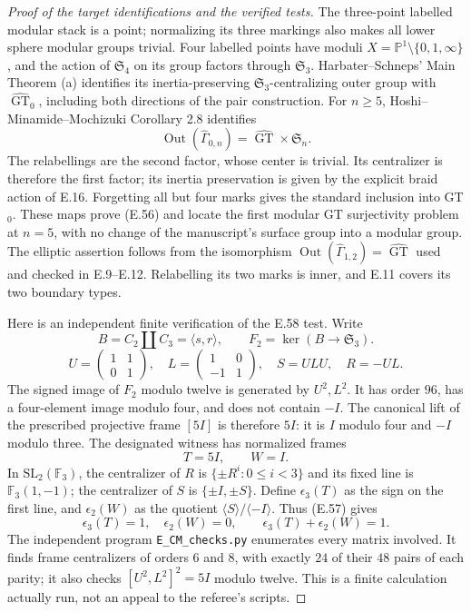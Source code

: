 \begin{proof}[Proof of the target identifications and the verified tests]
The three-point labelled modular stack is a point;
normalizing its three markings also makes all lower
sphere modular groups trivial.  Four labelled points
have moduli $X=\mathbb P^1\setminus\{0,1,\infty\}$,
and the action of $\mathfrak S_4$ on its group factors
through $\mathfrak S_3$.  Harbater--Schneps' Main
Theorem (a) identifies its inertia-preserving
$\mathfrak S_3$-centralizing outer group with
$\widehat{\operatorname{GT}}_0$, including both
directions of the pair construction.  For $n\geq5$,
Hoshi--Minamide--Mochizuki Corollary 2.8 identifies
\[
 \operatorname{Out}(\widehat\Gamma_{0,n})
       =\widehat{\operatorname{GT}}\times\mathfrak S_n.
\]
The relabellings are the second factor, whose center
is trivial.  Its centralizer is therefore the first
factor; its inertia preservation is given by the
explicit braid action of E.16.  Forgetting all but
four marks gives the standard inclusion into GT$_0$.
These maps prove (E.56) and locate the first modular
GT surjectivity problem at $n=5$, with no change of
the manuscript's surface group into a modular group.
The elliptic assertion follows from the isomorphism
$\operatorname{Out}(\widehat\Gamma_{1,2})=\widehat{\operatorname{GT}}$
used and checked in E.9--E.12.  Relabelling its two
marks is inner, and E.11 covers its two boundary types.

Here is an independent finite verification of the
E.58 test.  Write
\[
 B=C_2\amalg C_3=\langle s,r\rangle,\qquad
 F_2=\ker(B\to\mathfrak S_3).
\]
\[
 U=\begin{pmatrix}1&1\\0&1\end{pmatrix},\quad
 L=\begin{pmatrix}1&0\\-1&1\end{pmatrix},\quad
 S=ULU,\quad R=-UL.
\]
The signed image of $F_2$ modulo twelve is generated
by $U^2,L^2$.  It has order $96$, has a four-element
image modulo four, and does not contain $-I$.
The canonical lift of the prescribed projective
frame $[5I]$ is therefore $5I$: it is $I$ modulo
four and $-I$ modulo three.  The designated witness
has normalized frames
\[
                    T=5I,\qquad W=I.                       \tag{E.57}
\]
In $\mathrm{SL}_2(\mathbb F_3)$, the centralizer
of $R$ is $\{\pm R^i:0\leq i<3\}$ and its
fixed line is $\mathbb F_3(1,-1)$; the centralizer
of $S$ is $\{\pm I,\pm S\}$.  Define
$\epsilon_3(T)$ as the sign on the first line,
and $\epsilon_2(W)$ as the quotient
$\langle S\rangle/\langle-I\rangle$.
Thus (E.57) gives
\[
             \epsilon_3(T)=1,\quad\epsilon_2(W)=0,
             \qquad\epsilon_3(T)+\epsilon_2(W)=1.          \tag{E.58}
\]
The independent program \texttt{E\_CM\_checks.py}
enumerates every matrix involved.  It finds frame
centralizers of orders $6$ and $8$, with exactly
$24$ of their $48$ pairs of each parity; it also
checks $[U^2,L^2]^2=5I$ modulo twelve.  This is a
finite calculation actually run, not an appeal to
the referee's scripts.


\end{proof}
